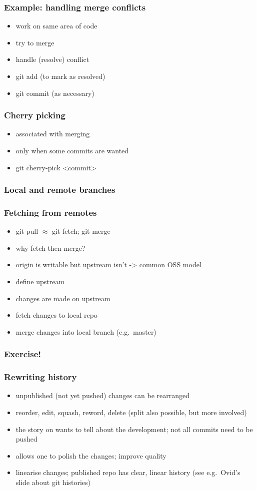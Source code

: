 \begin{frame}
\frametitle{Example: handling merge conflicts}
\begin{itemize}
    \item work on same area of code
    \item try to merge
    \item handle (resolve) conflict
    \item git add (to mark as resolved)
    \item git commit (as necessary)
\end{itemize}
\end{frame}

\begin{frame}
\frametitle{Cherry picking}
\begin{itemize}
    \item associated with merging
    \item only when some commits are wanted
    \item git cherry-pick <commit>
\end{itemize}
\end{frame}

\begin{frame}
\frametitle{Local and remote branches}
\end{frame}

\begin{frame}
\frametitle{Fetching from remotes}
\begin{itemize}
    \item git pull $\approx$ git fetch; git merge
    \item why fetch then merge?
    \item origin is writable but upstream isn't -> common OSS model
    \item define upstream
    \item changes are made on upstream
    \item fetch changes to local repo
    \item merge changes into local branch (e.g.\ master)
\end{itemize}
\end{frame}

\begin{frame}
\frametitle{Exercise!}
\end{frame}

\begin{frame}
\frametitle{Rewriting history}
\begin{itemize}
    \item unpublished (not yet pushed) changes can be rearranged
    \item reorder, edit, squash, reword, delete (split also possible,
        but more involved)
    \item the story on wants to tell about the development; not all
        commits need to be pushed
    \item allows one to polish the changes; improve quality
    \item linearise changes; published repo has clear, linear history
        (see e.g.\ Ovid's slide about git histories)
\end{itemize}
\end{frame}

